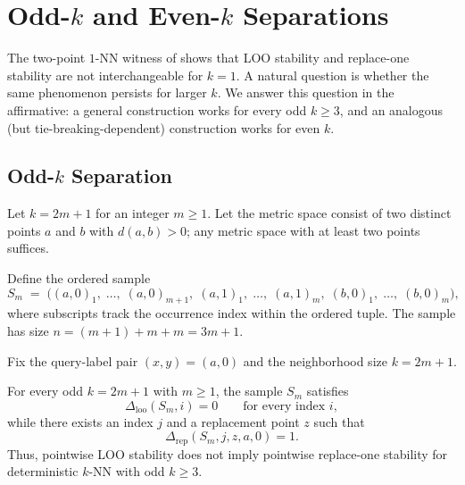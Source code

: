 \section{Odd-$k$ and Even-$k$ Separations}
\label{sec:k-extension}

The two-point $1$-NN witness of  shows that LOO
stability and replace-one stability are not interchangeable for $k=1$. A natural
question is whether the same phenomenon persists for larger $k$. We answer this
question in the affirmative: a general construction works for every odd $k \ge
3$, and an analogous (but tie-breaking-dependent) construction works for even
$k$.

\subsection{Odd-$k$ Separation}

Let $k = 2m+1$ for an integer $m \ge 1$. Let the metric space consist of two
distinct points $a$ and $b$ with $d(a,b) > 0$; any metric space with at least
two points suffices.

Define the ordered sample
\[
S_m \;=\; \big((a,0)_1,\; \ldots,\; (a,0)_{m+1},\;
          (a,1)_1,\; \ldots,\; (a,1)_{m},\;
          (b,0)_1,\; \ldots,\; (b,0)_{m}\big),
\]
where subscripts track the occurrence index within the ordered tuple.
The sample has size $n = (m+1) + m + m = 3m+1$.

Fix the query-label pair $(x,y) = (a,0)$ and the neighborhood size $k = 2m+1$.

\begin{theorem}
\label{thm:odd-k-separation}
For every odd $k = 2m+1$ with $m \ge 1$, the sample $S_m$ satisfies
\[
\Delta_{\mathrm{loo}}(S_m, i) = 0 \qquad \text{for every index } i,
\]
while there exists an index $j$ and a replacement point $z$ such that
\[
\Delta_{\mathrm{rep}}(S_m, j, z, a, 0) = 1.
\]
Thus, pointwise LOO stability does not imply pointwise replace-one stability
for deterministic $k$-NN with odd $k \ge 3$.
\end{theorem}

